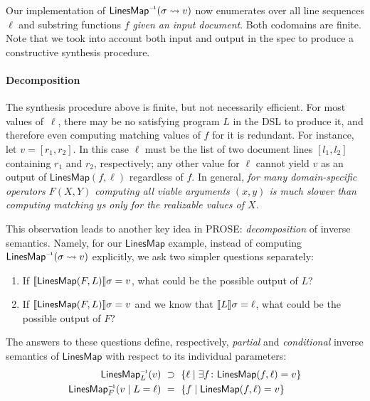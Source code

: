 Our implementation of $\mathsf{LinesMap}^{{\scriptscriptstyle-\!1}}(\sigma \rightsquigarrow v)$ now enumerates over all line sequences
$\ell$ and substring functions $f$ \emph{given an input document}.
Both codomains are finite.
Note that we took into account both input and output in the spec to produce a constructive synthesis procedure.

\paragraph{Decomposition}
The synthesis procedure above is finite, but not necessarily efficient.
For most values of~$\ell$, there may be no satisfying program $L$ in the DSL to produce it, and therefore even
computing matching values of $f$ for it is redundant.
For instance, let $v = [r_1, r_2]$.
In this case $\ell$ must be the list of two document lines $[l_1, l_2]$ containing $r_1$ and $r_2$, respectively; any
other value for $\ell$ cannot yield $v$ as an output of $\mathsf{LinesMap}(f, \ell)$ regardless of $f$.
In general, \emph{for many domain-specific operators $F(X, Y)$ computing all viable
arguments $(x, y)$ is much slower than computing matching $y$s only for the realizable values of $X$}.

This observation leads to another key idea in PROSE: \emph{decomposition} of inverse semantics.
Namely, for our $\mathsf{LinesMap}$ example, instead of computing $\mathsf{LinesMap}^{{\scriptscriptstyle-\!1}}(\sigma \rightsquigarrow v)$
explicitly, we ask two simpler questions separately:
\begin{enumerate}[nosep]
    \item If $\llbracket \mathsf{LinesMap}(F, L) \rrbracket{\ensuremath{\sigma}} = v$, what could be the possible output of $L$?
    \item If $\llbracket \mathsf{LinesMap}(F, L) \rrbracket{\ensuremath{\sigma}} = v$ and we know that $\llbracket L \rrbracket{\ensuremath{\sigma}} = \ell$, what
        could be the possible output of $F$?
\end{enumerate}
The answers to these questions define, respectively, \emph{partial} and \emph{conditional} inverse semantics of
$\mathsf{LinesMap}$ with respect to its individual parameters:
\begingroup\allowdisplaybreaks
\begin{align}
    \mathsf{LinesMap}^{\inv}_L(v) \ &\supset\ \left\{ \ell \mid \exists f\colon \mathsf{LinesMap}(f, \ell) = v \right\}
    \label{eqn:derivation:partial} \\
    \mathsf{LinesMap}^{\inv}_F (v \assuming L = \ell) \ &=\ \left\{ f \mid \mathsf{LinesMap}(f, \ell) = v \right\}
    \label{eqn:derivation:conditional}
\end{align}
\endgroup

